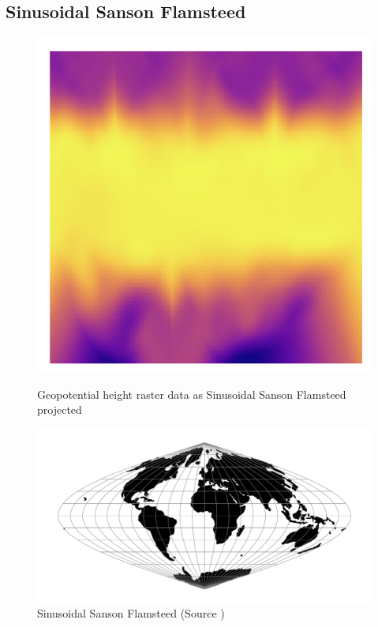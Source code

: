 \subsection{Sinusoidal Sanson Flamsteed}
\begin{figure}[H]
    \centering
    \begin{minipage}{0.30\textwidth}
        \centering
        \includegraphics[width=0.9\linewidth]{figures/chapter-8/geopoth_goode.png}
        \caption{ Geopotential height raster data as Sinusoidal Sanson Flamsteed projected}
        \label{fig:ig_geopoth_raster}
    \end{minipage}\hfill
    \begin{minipage}{0.30\textwidth}
        \centering
        \includegraphics[width=0.9\linewidth]{figures/chapter-8/sinu.png}
        \caption{Sinusoidal Sanson Flamsteed (Source \cite{PROJ_SITE})}

\end{minipage}
\end{figure}
